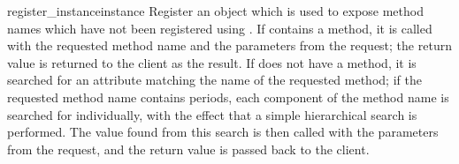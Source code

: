 \begin{methoddesc}[SimpleXMLRPCServer]{register_instance}{instance}
  Register an object which is used to expose method names which have
  not been registered using .  If
   contains a  method, it is called
  with the requested method name and the parameters from the request;
  the return value is returned to the client as the result.  If
   does not have a  method, it is
  searched for an attribute matching the name of the requested method;
  if the requested method name contains periods, each component of the
  method name is searched for individually, with the effect that a
  simple hierarchical search is performed.  The value found from this
  search is then called with the parameters from the request, and the
  return value is passed back to the client.
\end{methoddesc}

